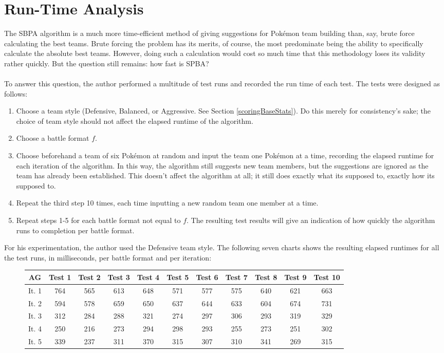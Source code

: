 \documentclass{article}
\begin{document}
\section{Run-Time Analysis}
The SBPA algorithm is a much more time-efficient method of giving suggestions for Pok\'emon team building than, say, brute force calculating the best teams. Brute forcing the problem has its merits, of course, the most predominate being the ability to specifically calculate the absolute best teams. However, doing such a calculation would cost so much time that this methodology loses its validity rather quickly. But the question still remains: how fast is SPBA?\\\\
To answer this question, the author performed a multitude of test runs and recorded the run time of each test. The tests were designed as follows:
\begin{enumerate}
	\item Choose a team style (Defensive, Balanced, or Aggressive. See Section \ref{scoringBaseStats}). Do this merely for consistency's sake; the choice of team style should not affect the elapsed runtime of the algorithm.  
	\item Choose a battle format $f$.
	\item Choose beforehand a team of six Pok\'emon at random and input the team one Pok\'emon at a time, recording the elapsed runtime for each iteration of the algorithm. In this way, the algorithm still suggests new team members, but the suggestions are ignored as the team has already been established. This doesn't affect the algorithm at all; it still does exactly what its supposed to, exactly how its supposed to.
	\item Repeat the third step 10 times, each time inputting a new random team one member at a time.
	\item Repeat steps 1-5 for each battle format not equal to $f$. The resulting test results will give an indication of how quickly the algorithm runs to completion per battle format.
\end{enumerate}
For his experimentation, the author used the Defensive team style. The following seven charts shows the resulting elapsed runtimes for all the test runs, in milliseconds, per battle format and per iteration:
\begin{figure}[H]
	\begin{tabular}{c||c|c|c|c|c|c|c|c|c|c}
		AG&Test 1&Test 2&Test 3&Test 4&Test 5&Test 6&Test 7&Test 8&Test 9&Test 10\\
		\hline\hline
		It. 1&764&565&613&648&571&577&575&640&621&663\\
		It. 2&594&578&659&650&637&644&633&604&674&731\\
		It. 3&312&284&288&321&274&297&306&293&319&329\\
		It. 4&250&216&273&294&298&293&255&273&251&302\\
		It. 5&339&237&311&370&315&307&310&341&269&315\\
	\end{tabular}
	\centering
\end{figure}
\end{document}

